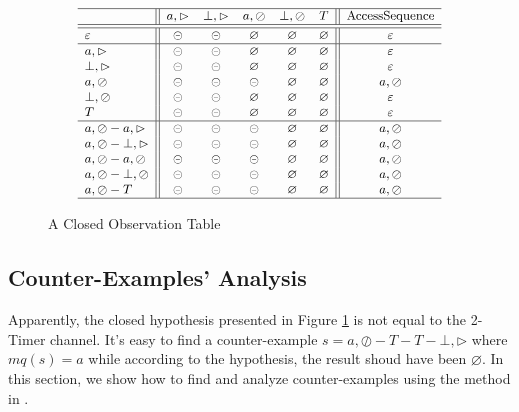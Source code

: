 \documentclass[conference, a4paper]{IEEEtran}
\newcommand{\rblock}[0]{\circleddash}
\newcommand{\rread}[0]{\rhd}
\newcommand{\rnoread}[0]{\oslash}
\newcommand{\rempty}[0]{\varnothing}
\begin{document}
\begin{figure}[ht]
  \begin{center}
    \begin{displaymath}
      \small
      \begin{array}{l||ccccc||c}
        \hline
        & a,\rread & \bot,\rread & a,\rnoread & \bot,\rnoread & T & \mbox{AccessSequence}\\
        \hline\hline
        \varepsilon & \rblock & \rblock & \rempty & \rempty & \rempty & \varepsilon \\
        \hline
        a,\rread & \rblock & \rblock & \rempty & \rempty & \rempty & \varepsilon\\
        \bot,\rread & \rblock & \rblock & \rempty & \rempty & \rempty & \varepsilon \\
        a,\rnoread & \rblock & \rblock & \rblock & \rempty & \rempty & a,\rnoread \\
        \bot,\rnoread & \rblock & \rblock & \rempty & \rempty & \rempty & \varepsilon \\
        T & \rblock & \rblock & \rempty & \rempty & \rempty & \varepsilon \\
        \hline
        a,\rnoread-a,\rread & \rblock & \rblock & \rblock & \rempty & \rempty & a,\rnoread \\
        a,\rnoread-\bot,\rread & \rblock & \rblock & \rblock & \rempty & \rempty & a,\rnoread \\
        a,\rnoread-a,\rnoread & \rblock & \rblock & \rblock & \rempty & \rempty & a,\rnoread \\
        a,\rnoread-\bot,\rnoread & \rblock & \rblock & \rblock & \rempty & \rempty & a,\rnoread \\
        a,\rnoread-T & \rblock & \rblock & \rblock & \rempty & \rempty & a,\rnoread \\
        \hline
      \end{array}
    \end{displaymath}
  \end{center}
  \caption{A Closed Observation Table}
  \label{fig:hypo2}
\end{figure}

\subsection{Counter-Examples' Analysis} 
Apparently, the closed hypothesis presented in Figure \ref{fig:hypo2} is not equal to the 2-Timer
channel. It's easy to find a counter-example $s=a,\rnoread-T-T-\bot,\rread$ where $mq(s)=a$ while
according to the hypothesis, the result shoud have been $\rempty$. In this section, we show how to
find and analyze counter-examples using the method in \cite{DBLP:conf/sfm/SteffenHM11}. 
\end{document}

